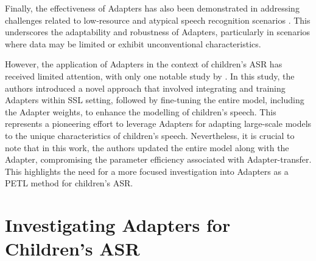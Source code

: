 
Finally, the effectiveness of Adapters has also been demonstrated in addressing challenges related to low-resource and atypical speech recognition scenarios \cite{tomanek2021residual}. This underscores the adaptability and robustness of Adapters, particularly in scenarios where data may be limited or exhibit unconventional characteristics. 

However, the application of Adapters in the context of children's \ac{ASR} has received limited attention, with only one notable study by \cite{fan2022draft}. In this study, the authors introduced a novel approach that involved integrating and training Adapters within \ac{SSL} setting, followed by fine-tuning the entire model, including the Adapter weights,  to enhance the modelling of children's speech. This represents a pioneering effort to leverage Adapters for adapting large-scale models to the unique characteristics of children's speech. Nevertheless, it is crucial to note that in this work, the authors updated the entire model along with the Adapter, compromising the parameter efficiency associated with Adapter-transfer. This highlights the need for a more focused investigation into Adapters as a \ac{PETL} method for children's \ac{ASR}. 

\section{Investigating Adapters for Children's ASR}

